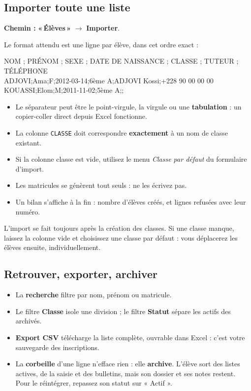 \documentclass[11pt,a4paper]{article}
\newcommand{\menu}[1]{\textbf{«\,#1\,»}}
\newcommand{\bouton}[1]{\textbf{#1}}
\newcommand{\champ}[1]{\textit{#1}}
\begin{document}
\subsection{Importer toute une liste}

\textbf{Chemin :} \menu{Élèves} $\rightarrow$ \bouton{Importer}.

Le format attendu est une ligne par élève, dans cet ordre exact :

\begin{boitecode}
NOM ; PRÉNOM ; SEXE ; DATE DE NAISSANCE ; CLASSE ; TUTEUR ; TÉLÉPHONE\\[4pt]
\hspace*{1em}ADJOVI;Ama;F;2012-03-14;6ème A;ADJOVI Kossi;+228 90 00 00 00\\
\hspace*{1em}KOUASSI;Elom;M;2011-11-02;5ème A;;
\end{boitecode}

\begin{itemize}
  \item Le séparateur peut être le point-virgule, la virgule ou une
        \textbf{tabulation} : un copier-coller direct depuis Excel fonctionne.
  \item La colonne \texttt{CLASSE} doit correspondre \textbf{exactement} à un nom
        de classe existant.
  \item Si la colonne classe est vide, utilisez le menu
        \champ{Classe par défaut} du formulaire d'import.
  \item Les matricules se génèrent tout seuls : ne les écrivez pas.
  \item Un bilan s'affiche à la fin : nombre d'élèves créés, et lignes refusées
        avec leur numéro.
\end{itemize}

\begin{boiteastuce}
L'import se fait toujours après la création des classes. Si une classe manque,
laissez la colonne vide et choisissez une classe par défaut : vous déplacerez les
élèves ensuite, individuellement.
\end{boiteastuce}

\subsection{Retrouver, exporter, archiver}

\begin{itemize}
  \item La \textbf{recherche} filtre par nom, prénom ou matricule.
  \item Le filtre \textbf{Classe} isole une division ; le filtre \textbf{Statut}
        sépare les actifs des archivés.
  \item \bouton{Export CSV} télécharge la liste complète, ouvrable dans Excel :
        c'est votre sauvegarde des inscriptions.
  \item La \textbf{corbeille} d'une ligne n'efface rien : elle \textbf{archive}.
        L'élève sort des listes actives, de la saisie et des bulletins, mais son
        dossier et ses notes restent. Pour le réintégrer, repassez son statut sur
        « Actif ».
\end{itemize}
\end{document}
